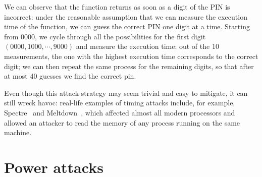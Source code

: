 We can observe that the function returns as soon as a digit of the PIN is incorrect: under the reasonable assumption that we can measure 
the execution time of the function, we can guess the correct PIN one digit at a time.
Starting from 0000, we cycle through all the possibilities for the first digit $(0000, 1000, \cdots, 9000)$ and measure the execution time:
out of the 10 measurements, the one with the highest execution time corresponds to the correct digit; we can then repeat the same process
for the remaining digits, so that after at most 40 guesses we find the correct pin.

Even though this attack strategy may seem trivial and easy to mitigate, it can still wreck havoc: real-life examples of timing attacks include, 
for example, Spectre~\cite{Kocher2018spectre} and Meltdown~\cite{Lipp2018meltdown}, which affected almost all modern processors and allowed
an attacker to read the memory of any process running on the same machine.

\section{Power attacks}
